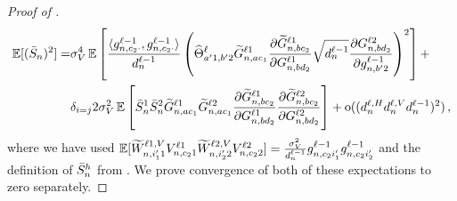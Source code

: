 \begin{proof}[Proof of ]
\begin{align}
        \operatorname*{\mathbb{E}} [(\bar{S}_{n})^2]
        =
        &\sigma_{V}^4
        \operatorname*{\mathbb{E}} \left[
            \frac{
                \langle
                    g_{n, c_2 \cdot}^{\ell - 1}
                    ,
                    g_{n, c_2 \cdot}^{\ell - 1}
                \rangle
            }{
                d_{n}^{\ell - 1}
            }
            \left(
                \widehat{\Theta}_{
                    a' 1, b' 2
                }^{\ell}
                \widetilde{G}_{n, a c_1}^{\ell 1}
                \frac{
                    \partial
                    \widetilde{G}_{n, b c_2}^{\ell 1}
                }{
                    \partial 
                    G_{n, b d_2}^{\ell 1}
                }
                \sqrt{d_{n}^{\ell - 1}}
                \frac{
                    \partial 
                    G_{n, b d_2}^{\ell 2}
                }{
                    \partial g_{n, b' 2}^{\ell - 1}
                }
            \right)^2
        \right]
        +
        \\
        &
        \delta_{i = j}
        2
        \sigma_{V}^2
        \operatorname*{\mathbb{E}} \left[
            \bar{S}_{n}^{1}
            \bar{S}_{n}^{2}
            \widetilde{G}_{n, a c_1}^{\ell 1}
            \widetilde{G}_{n, a c_1}^{\ell 2}
            \frac{
                \partial
                \widetilde{G}_{n, b c_2}^{\ell 1}
            }{
                \partial 
                G_{n, b d_2}^{\ell 1}
            }
                    \frac{
                        \partial
                        \widetilde{G}_{n, b c_2}^{\ell 2}
                    }{
                        \partial 
                        G_{n, b d_2}^{\ell 2}
                    }
        \right]
        +
        \mathrm{o}((d_{n}^{\ell, H} d_{n}^{\ell, V} d_{n}^{\ell - 1})^2)
        \, ,
    \end{align}
    where we have used
    $
        \operatorname*{\mathbb{E}} [
            \widetilde{W}_{n, i'_{1} 1}^{\ell 1, V}
            V_{n, c_2 1}^{\ell 1} 
            \widetilde{W}_{n, i'_2 2}^{\ell 2, V}
            V_{n, c_2 2}^{\ell 2}
        ]
        =
        \frac{\sigma_{V}^2}{d_{n}^{\ell - 1}}
        g_{n, c_2 i'_1}^{\ell - 1}
        g_{n, c_2 i'_2}^{\ell - 1}
    $
    and the definition of $\bar{S}_{n}^h$ from .
    We prove convergence of both of these expectations to zero separately.
    

\end{proof}
